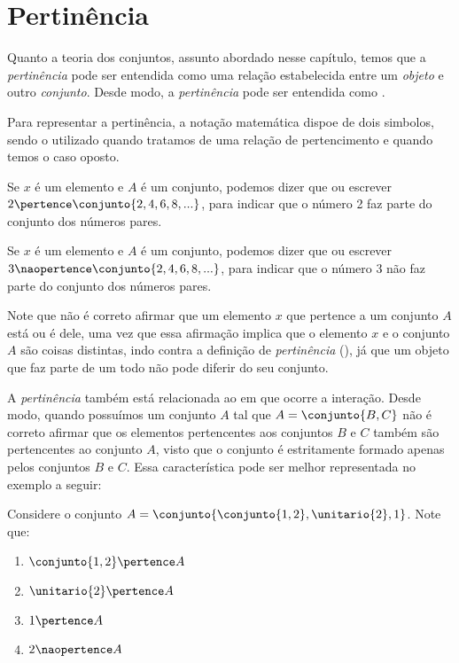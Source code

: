 \section{Pertinência}

Quanto a teoria dos conjuntos, assunto abordado nesse capítulo, temos que a \emph{pertinência} pode ser entendida como uma relação estabelecida entre um \emph{objeto} e outro \emph{conjunto}. Desde modo, a \emph{pertinência} pode ser entendida como \emph{}. 

Para representar a pertinência, a notação matemática dispoe de dois simbolos, sendo o \entreaspas{$\pertence$} utilizado quando tratamos de uma relação de pertencimento e \entreaspas{$\naopertence$} quando temos o caso oposto.

\begin{example}
    Se $x$ é um elemento e $A$ é um conjunto, podemos dizer que  ou escrever $2 \pertence \conjunto {2, 4, 6, 8, ...}$, para indicar que o número 2 faz parte do conjunto dos números pares.
\end{example}

\begin{example}
    Se $x$ é um elemento e $A$ é um conjunto, podemos dizer que  ou escrever $3 \naopertence \conjunto {2, 4, 6, 8, ...}$, para indicar que o número 3 não faz parte do conjunto dos números pares.
\end{example}

Note que não é correto afirmar que um elemento $x$ que pertence a um conjunto $A$ está  ou é  dele, uma vez que essa afirmação implica que o elemento $x$ e o conjunto $A$ são coisas distintas, indo contra a definição de \emph{pertinência} (\emph{}), já que um objeto que faz parte de um todo não pode diferir do seu conjunto.

A \emph{pertinência} também está relacionada ao  em que ocorre a interação. Desde modo, quando possuímos um conjunto $A$ tal que $A = \conjunto {B,C}$ não é correto afirmar que os elementos pertencentes aos conjuntos $B$ e $C$ também são pertencentes ao conjunto $A$, visto que o conjunto é estritamente formado apenas pelos conjuntos $B$ e $C$. Essa característica pode ser melhor representada no exemplo a seguir:

\begin{example}
    \label{exe:conjuntos-de-conjuntos-explicito}
    Considere o conjunto $A = \conjunto{\conjunto{1, 2},\unitario{2}, 1}$. Note que:
    \begin{enumerate}
        \item $\conjunto{1, 2} \pertence A$
        \item $\unitario{2} \pertence A$
        \item $1 \pertence A$
        \item $2 \naopertence A$
    \end{enumerate}
\end{example}
